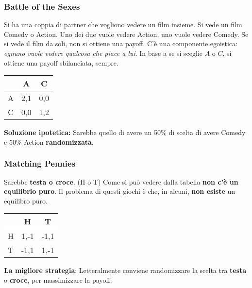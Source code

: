 \subsubsection{Battle of the Sexes}
Si ha una coppia di partner che vogliono vedere un film insieme. Si vede un
film Comedy o Action. Uno dei due vuole vedere Action, uno vuole vedere Comedy.
Se si vede il film da soli, non si ottiene una payoff. C'è una componente
egoistica: \textit{ognuno vuole vedere qualcosa che piace a lui}. In base a se
si sceglie $A$ o $C$, si ottiene una payoff sbilanciata, sempre.

\begin{table}[H]
    \begin{center}
        \begin{tabular}{|c|c|c|}
            \hline
              & A   & C   \\
            \hline
            A & 2,1 & 0,0 \\
            \hline
            C & 0,0 & 1,2 \\
            \hline
        \end{tabular}
    \end{center}
\end{table}

\textbf{Soluzione ipotetica:} Sarebbe quello di avere un 50\% di scelta di avere Comedy e 50\% Action \textbf{randomizzata}.

\subsubsection{Matching Pennies}
Sarebbe \textbf{testa o croce}. (H o T) Come si può vedere dalla tabella
\textbf{non c'è un equilibrio puro}. Il problema di questi giochi è che, in
alcuni, \textbf{non esiste} un equilibro puro.
\begin{table}[H]
    \begin{center}
        \begin{tabular}{|c|c|c|}
            \hline
              & H    & T    \\
            \hline
            H & 1,-1 & -1,1 \\
            \hline
            T & -1,1 & 1,-1 \\
            \hline
        \end{tabular}
    \end{center}
\end{table}

\textbf{La migliore strategia}: Letteralmente conviene randomizzare la scelta tra \textbf{testa} o \textbf{croce}, per massimizzare la payoff.

